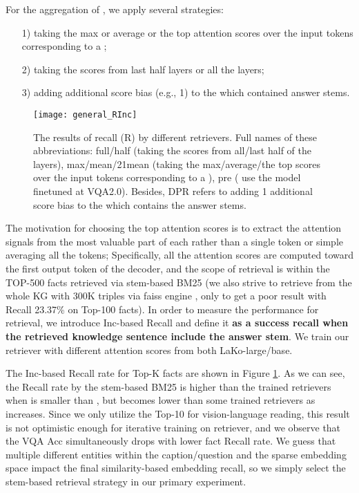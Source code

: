 \documentclass[sigconf]{acmart}
\newcommand{\cjy}[1]{{\color{black}#1}}
\begin{document}
For the aggregation of , we apply several strategies: 

\begin{enumerate}

\item [1)] taking the max or average or the top  attention scores over the input tokens corresponding to a ; 
\item [2)] taking the scores from last half layers or all the layers;
\item [3)] \cjy{adding} additional score bias (e.g., 1) to the  which contained answer stems.

\end{enumerate}

\begin{figure}[htbp]
  \texttt{[image: general\_RInc]}
  \vspace{-1mm}
    \caption{The results of recall \cjy{(R) by different retrievers.}
Full names of these abbreviations: 
    full/half (taking the scores from all/last half of the layers), max/mean/21mean (taking the max/average/the top  scores over the input tokens corresponding to a ), pre ( use the model finetuned at VQA2.0). Besides, DPR \citep{DBLP:conf/emnlp/KarpukhinOMLWEC20} refers to adding 1 additional score bias to the  which contains the answer stems.
    } 
  \vspace{-2mm}
  \label{fig:inc}
\end{figure}

The motivation for choosing the top  attention scores is to extract the attention signals from the most valuable part of each  rather than a single token or simple averaging all the tokens;
Specifically, all the attention scores are computed toward \cjy{the} first output token of the decoder, and the scope of retrieval is within the TOP-500 fact\cjy{s} retrieved via stem-based BM25 (we also strive to retrieve from the whole KG with 300K triples via faiss engine \cite{johnson2019billion}, only to get a poor result with Recall 23.37\% on Top-100 facts). 
In order to measure the performance for retrieval, we introduce Inc-based Recall and define it \textbf{as a success recall when the retrieved knowledge sentence include the answer stem}. 
We train our retriever with different attention scores from both LaKo-large/base.

The Inc-based Recall rate for Top-K fact\cjy{s} are shown in Figure \ref{fig:inc}.
As we can see, the Recall rate
\cjy{by the stem-based BM25 is higher than the trained retriever\cjy{s} when  is smaller than , but becomes lower than some trained retrievers as  increases.}
Since we only utilize the Top-10  for vision-language reading,  this result is not optimistic enough for iterative training on retriever, and we observe that the VQA Acc simultaneously drops with lower fact Recall rate.
We guess that multiple different entities within the caption/question and the sparse embedding space impact the  final similarity-based embedding recall, so we simply select the stem-based retrieval strategy in our primary experiment.
\end{document}
